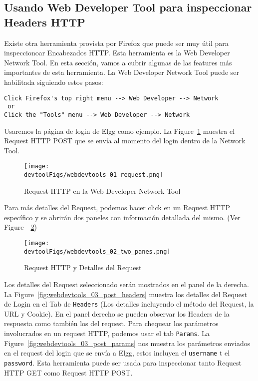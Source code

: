 \subsection{Usando Web Developer Tool para inspeccionar Headers HTTP}
\label{web:sec:web_dev_tools}

Existe otra herramienta provista por Firefox que puede ser muy útil para inspeccionoar Encabezados HTTP.
Esta herramienta es la Web Developer Network Tool. En esta sección, vamos a cubrir algunas de las features más importantes de esta herramienta.
La Web Developer Network Tool puede ser habilitada siguiendo estos pasos:

\begin{lstlisting}
Click Firefox's top right menu --> Web Developer --> Network
 or 
Click the "Tools" menu --> Web Developer --> Network 
\end{lstlisting}

Usaremos la página de login de Elgg como ejemplo.
La Figure~\ref{fig:webdevtools_01_request} muestra el Request HTTP POST que se envía al momento del login dentro de la Network Tool.

\begin{figure}[htb]
\begin{center}
\texttt{[image: \\devtoolFigs/webdevtools\_01\_request.png]}
\end{center}
\caption{Request HTTP en la Web Developer Network Tool}
\label{fig:webdevtools_01_request}
\end{figure}

Para más detalles del Request, podemos hacer click en un Request HTTP específico y se abrirán dos paneles con información detallada del mismo. (Ver Figure~\ \ref{fig:webdevtools_02_two_panes})

\begin{figure}[htb]
\begin{center}
	\texttt{[image: \\devtoolFigs/webdevtools\_02\_two\_panes.png]}
\end{center}
\caption{Request HTTP y Detalles del Request}
\label{fig:webdevtools_02_two_panes}
\end{figure}


Los detalles del Request seleccionado serán mostrados en el panel de la derecha.
La Figure~\ref{fig:webdevtools_03_post_headers} muestra los detalles del Request de Login en el Tab de 
\texttt{Headers} (Los detalles incluyendo el método del Request, la URL y Cookie). En el panel derecho se pueden observar los Headers de la respuesta como también los del request.
Para chequear los parámetros involucrados en un request HTTP, podemos usar el tab \texttt{Params}. La Figure~\ref{fig:webdevtools_03_post_params} nos muestra los parámetros enviados en el request del login que se envía a Elgg, estos incluyen el \texttt{username}  t el \texttt{password}. Esta herramienta puede ser usada para inspeccionar tanto Request HTTP GET como Request HTTP POST.

